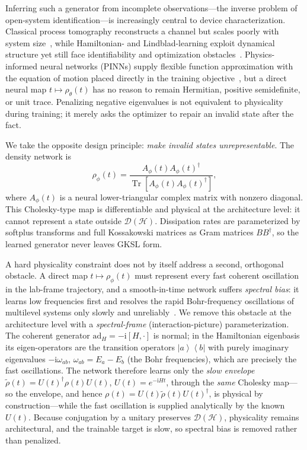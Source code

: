 \documentclass[twocolumn,aps,prxquantum,superscriptaddress,nofootinbib,floatfix,longbibliography]{revtex4-2}
\DeclareMathOperator{\Tr}{Tr}
\newcommand{\calD}{\mathcal{D}}
\newcommand{\ii}{\mathrm{i}}
\newcommand{\ket}[1]{\left\lvert #1 \right\rangle}
\newcommand{\bra}[1]{\left\langle #1 \right\rvert}
\newcommand{\hilb}{\mathcal{H}}
\newcommand{\rhophi}{\rho_{\phi}}
\begin{document}
Inferring such a generator from incomplete observations---the inverse problem of open-system identification---is increasingly central to device characterization. Classical process tomography reconstructs a channel but scales poorly with system size~\cite{chuang1997prescription,poyatos1997complete,knee2018quantum}, while Hamiltonian- and Lindblad-learning exploit dynamical structure yet still face identifiability and optimization obstacles~\cite{boulant2003robust,wang2017experimental}. Physics-informed neural networks (PINNs) supply flexible function approximation with the equation of motion placed directly in the training objective~\cite{raissi2019physics,karniadakis2021physics,chen2018neural}, but a direct neural map $t\mapsto\rho_\theta(t)$ has no reason to remain Hermitian, positive semidefinite, or unit trace. Penalizing negative eigenvalues is not equivalent to physicality during training; it merely asks the optimizer to repair an invalid state after the fact.

We take the opposite design principle: \emph{make invalid states unrepresentable}. The density network is
\begin{equation}
    \rhophi(t)=\frac{A_\phi(t)A_\phi(t)^\dagger}{\Tr[A_\phi(t)A_\phi(t)^\dagger]},
    \label{eq:intro_cholesky}
\end{equation}
where $A_\phi(t)$ is a neural lower-triangular complex matrix with nonzero diagonal. This Cholesky-type map is differentiable and physical at the architecture level: it cannot represent a state outside $\calD(\hilb)$. Dissipation rates are parameterized by softplus transforms and full Kossakowski matrices as Gram matrices $BB^\dagger$, so the learned generator never leaves GKSL form.

A hard physicality constraint does not by itself address a second, orthogonal obstacle. A direct map $t\mapsto\rhophi(t)$ must represent every fast coherent oscillation in the lab-frame trajectory, and a smooth-in-time network suffers \emph{spectral bias}: it learns low frequencies first and resolves the rapid Bohr-frequency oscillations of multilevel systems only slowly and unreliably~\cite{tancik2020fourier}. We remove this obstacle at the architecture level with a \emph{spectral-frame} (interaction-picture) parameterization. The coherent generator $\mathrm{ad}_H=-\ii[H,\cdot]$ is normal; in the Hamiltonian eigenbasis its eigen-operators are the transition operators $\ket{a}\!\bra{b}$ with purely imaginary eigenvalues $-\ii\omega_{ab}$, $\omega_{ab}=E_a-E_b$ (the Bohr frequencies), which are precisely the fast oscillations. The network therefore learns only the \emph{slow envelope} $\widetilde\rho(t)=U(t)^\dagger\rho(t)U(t)$, $U(t)=e^{-\ii Ht}$, through the \emph{same} Cholesky map---so the envelope, and hence $\rho(t)=U(t)\widetilde\rho(t)U(t)^\dagger$, is physical by construction---while the fast oscillation is supplied analytically by the known $U(t)$. Because conjugation by a unitary preserves $\calD(\hilb)$, physicality remains architectural, and the trainable target is slow, so spectral bias is removed rather than penalized.
\end{document}
